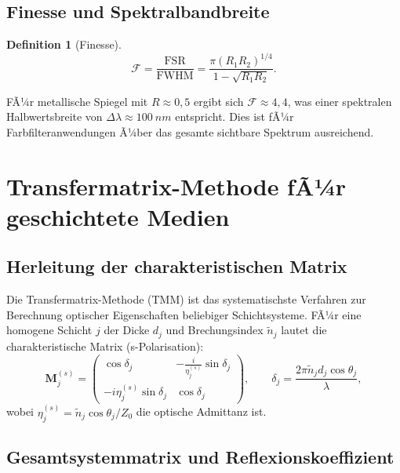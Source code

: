 ﻿\documentclass[a4paper,12pt]{scrreprt}
\theoremstyle{definition}
\newtheorem{definition}{Definition}[section]
\newcommand{\matr}[1]{\mathbf{#1}}
\begin{document}
\subsection{Finesse und Spektralbandbreite}

\begin{definition}[Finesse]
  \begin{equation}
    \mathcal{F} = \frac{\mathrm{FSR}}{\mathrm{FWHM}} = \frac{\pi (R_1 R_2)^{1/4}}{1 - \sqrt{R_1 R_2}}.
  \end{equation}
\end{definition}

FÃ¼r metallische Spiegel mit $R \approx 0{,}5$ ergibt sich $\mathcal{F} \approx 4{,}4$,
was einer spektralen Halbwertsbreite von $\Delta\lambda \approx \SI{100}{nm}$ entspricht.
Dies ist fÃ¼r Farbfilteranwendungen Ã¼ber das gesamte sichtbare Spektrum ausreichend.

\section{Transfermatrix-Methode fÃ¼r geschichtete Medien}

\subsection{Herleitung der charakteristischen Matrix}

Die Transfermatrix-Methode (TMM) ist das systematischste Verfahren zur
Berechnung optischer Eigenschaften beliebiger Schichtsysteme. FÃ¼r eine
homogene Schicht $j$ der Dicke $d_j$ und Brechungsindex $\tilde{n}_j$ lautet
die charakteristische Matrix (s-Polarisation):
\begin{equation}
  \matr{M}_j^{(s)} = \begin{pmatrix}
    \cos\delta_j & -\tfrac{i}{\eta_j^{(s)}} \sin\delta_j \\
    -i\eta_j^{(s)} \sin\delta_j & \cos\delta_j
  \end{pmatrix},
  \qquad \delta_j = \frac{2\pi \tilde{n}_j d_j \cos\theta_j}{\lambda},
\end{equation}
wobei $\eta_j^{(s)} = \tilde{n}_j \cos\theta_j / Z_0$ die optische Admittanz ist.

\subsection{Gesamtsystemmatrix und Reflexionskoeffizient}
\end{document}
